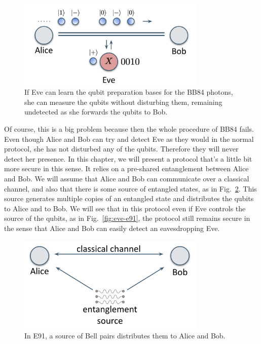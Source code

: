 \begin{figure}[H]
    \centering
    \includegraphics[width=0.8\textwidth]{lesson10/eavesdropping-on-bb84.png}
        \caption[Successful eavesdropping on BB84]{If Eve can learn the qubit preparation bases for the BB84 photons, she can measure the qubits without disturbing them, remaining undetected as she forwards the qubits to Bob.}
    \label{fig:eve-bb84}
\end{figure}

Of course, this is a big problem because then the whole procedure of BB84 fails. Even though Alice and Bob can try and detect Eve as they would in the normal protocol, she has not disturbed any of the qubits. Therefore they will never detect her presence. In this chapter, we will present a protocol that's a little bit more secure in this sense. It relies on a pre-shared entanglement between Alice and Bob. We will assume that Alice and Bob can communicate over a classical channel, and also that there is some source of entangled states, as in Fig.~\ref{fig:e91-setup}. This source generates multiple copies of an entangled state and distributes the qubits to Alice and to Bob. We will see that in this protocol even if Eve controls the source of the qubits, as in Fig.~\ref{fig:eve-e91}, the protocol still remains secure in the sense that Alice and Bob can easily detect an eavesdropping Eve.

\begin{figure}[H]
    \centering
    \includegraphics[width=0.8\textwidth]{lesson10/e91-setup.png}
        \caption[E91 setup]{In E91, a source of Bell pairs distributes them to Alice and Bob.}
    \label{fig:e91-setup}
\end{figure}

